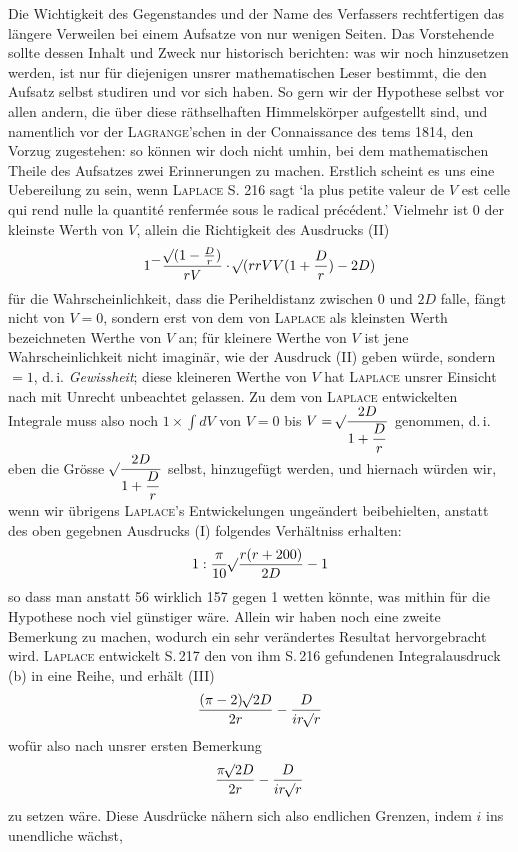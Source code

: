 Die Wichtigkeit des Gegenstandes und der Name des Verfassers rechtfertigen das längere Verweilen bei einem
Aufsatze von nur wenigen Seiten. Das Vorstehende sollte dessen Inhalt und Zweck nur historisch berichten:
was wir noch hinzusetzen werden, ist nur für diejenigen unsrer mathematischen Leser bestimmt, die den
Aufsatz selbst studiren und vor sich haben. So gern wir der Hypothese selbst vor allen andern, die über
diese räthselhaften Himmelskörper aufgestellt sind, und namentlich vor der \textsc{Lagrange}'schen in der
Connaissance des tems 1814, den Vorzug zugestehen: so können wir doch nicht umhin, bei dem mathematischen
Theile des Aufsatzes zwei Erinnerungen zu machen. Erstlich scheint es uns eine Uebereilung zu sein, wenn
\textsc{Laplace} S. 216 sagt `la plus petite valeur de $V$ est celle qui rend nulle la quantité renfermée
sous le radical précédent.' Vielmehr ist 0 der kleinste Werth von $V$, allein die Richtigkeit des
Ausdrucks (II)
\[1{}^{\displaystyle -}\frac{\mathord{{}^{}\!\surd}(1-\frac{D}{r})}{rV}\cdot\mathord{{}^{}\!\surd}(rrVV(1+\frac{D}{r})-2D)\]
für die Wahrscheinlichkeit, dass die Periheldistanz zwischen 0 und $2D$ falle, fängt nicht von $V=0$,
sondern erst von dem von \textsc{Laplace} als kleinsten Werth bezeichneten Werthe von $V$ an; für kleinere
Werthe von $V$ ist jene Wahrscheinlichkeit nicht imaginär, wie der Ausdruck (II) geben würde, sondern $= 1$, d.\,i. \emph{Gewissheit}; diese kleineren Werthe von $V$ hat \textsc{Laplace} unsrer Einsicht nach mit
Unrecht unbeachtet gelassen. Zu dem von \textsc{Laplace} entwickelten Integrale muss also noch
$1\times\int dV$ von $V = 0$ bis $V = \mathord{{}^{}\!\surd}\dfrac{2D}{1+\dfrac{D}{r}}$ genommen, d.\,i. eben
die Grösse $\mathord{{}^{}\!\surd}\dfrac{2D}{1+\dfrac{D}{r}}$ selbst, hinzugefügt werden, und hiernach würden wir,
wenn wir übrigens \textsc{Laplace}'s Entwickelungen ungeändert beibehielten, anstatt des oben gegebnen
Ausdrucks (I) folgendes Verhältniss erhalten:
\[1 : \frac{\pi}{10}\mathord{{}^{}\!\surd}\frac{r(r+200)}{2D} - 1\]
so dass man anstatt 56 wirklich 157 gegen 1 wetten könnte, was mithin für die Hypothese noch viel
günstiger wäre. Allein wir haben noch eine zweite Bemerkung zu machen, wodurch ein sehr verändertes
Resultat hervorgebracht wird. \textsc{Laplace} entwickelt S.\,217 den von ihm S.\,216 gefundenen
Integralausdruck (b) in eine Reihe, und erhält (III)
\[\frac{(\pi-2)\mathord{{}^{}\!\surd}2D}{2r} - \frac{D}{ir\mathord{{}^{}\!\surd}r}\]
wofür also nach unsrer ersten Bemerkung
\[
\frac{\pi\mathord{{}^{}\!\surd}2D}{2r} - \frac{D}{ir\mathord{{}^{}\!\surd}r}
\]
zu setzen wäre. Diese Ausdrücke nähern sich also endlichen Grenzen, indem $i$ ins unendliche wächst,
